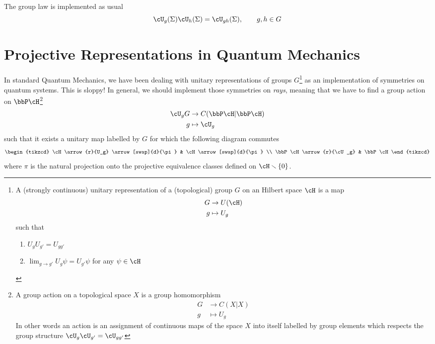 The group law is implemented as usual
\begin{equation}
	\cU_{g}(\Sigma)\cU_{h}(\Sigma)=\cU_{gh}(\Sigma),\qquad g,h\in G
\end{equation}

\section{Projective Representations in Quantum Mechanics}

In standard Quantum Mechanics, we have been dealing with unitary representations of groups $G$\footnote{A (strongly continuous) unitary representation of a (topological) group $G$ on an Hilbert space $\cH$ is a map
\begin{equation}
\begin{aligned}
    G &\to U(\cH)\\
g &\mapsto U_g
    \end{aligned}
\end{equation} 
such that
\begin{enumerate}
    \item $U_g U_{g'} = U_{g g'}$
    \item $\lim_{g \to g'} U_g \psi = U_{g'}  \psi$ for any $\psi \in \cH$
\end{enumerate}
} 
as an implementation of symmetries on quantum systems. This is sloppy! In general, we should implement those symmetries on \textit{rays}, meaning that we have to find a group action on $\bbP \cH$\footnote{A group action on a topological space $X$ is a group homomorphism
\begin{equation}
\begin{split}
    G &\to C(X|X)\\
    g &\mapsto U_g
\end{split}
\end{equation} 
In other words an action is an assignment of continuous maps of the space $X$ into itself labelled by group elements which respects the group structure $\cU_g \cU_{g'}= \cU_{gg'}$}
\begin{equation}
    \begin{aligned}
    \cU_{g}G &\to C (\bbP \cH|\bbP \cH)\\
    g &\mapsto \cU_g
    \end{aligned}
\end{equation}
such that it exists a unitary map labelled by $G$ for which the following diagram commutes
\[
\begin{tikzcd}
\cH \arrow{r}{U_g} \arrow[swap]{d}{\pi} & \cH   \arrow[swap]{d}{\pi}  \\
\bbP \cH \arrow{r}{\cU_g} & \bbP \cH  
\end{tikzcd}\]
where $\pi$ is the natural projection onto the projective equivalence classes defined on $\cH \smallsetminus \{0\}$.

